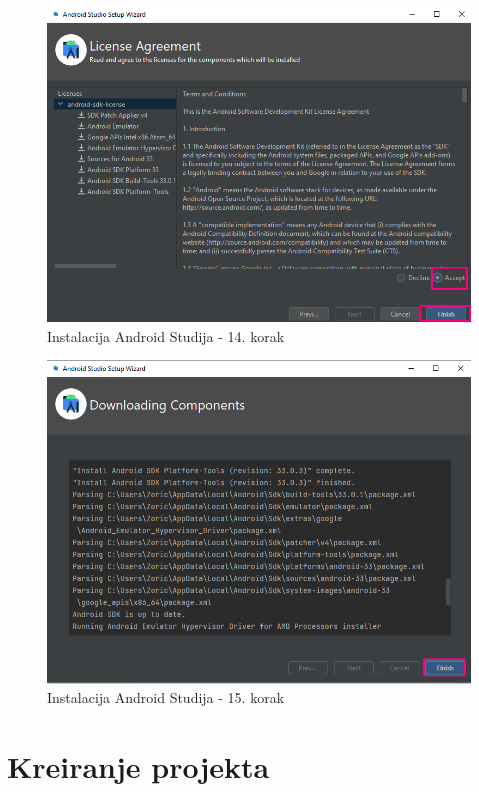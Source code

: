 \documentclass[11pt,a4paper,twoside]{article}
\begin{document}
\begin{figure}[!h]
	\centering
	\includegraphics[width=\textwidth]{install_14.png}
	\caption{Instalacija Android Studija - 14. korak}
	\label{fig:install_14}	
\end{figure}

\begin{figure}[!h]
	\centering
	\includegraphics[width=\textwidth]{install_15.png}
	\caption{Instalacija Android Studija - 15. korak}
	\label{fig:install_15}	
\end{figure}

\section{Kreiranje projekta}
\end{document}
